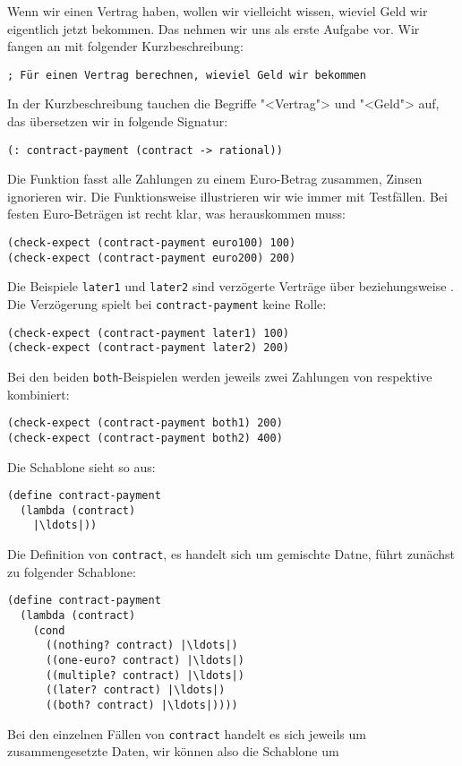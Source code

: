 Wenn wir einen Vertrag haben, wollen wir vielleicht wissen, wieviel
Geld wir eigentlich jetzt bekommen.  Das nehmen wir uns als erste
Aufgabe vor.  Wir fangen an mit folgender Kurzbeschreibung:
%
\begin{lstlisting}
; Für einen Vertrag berechnen, wieviel Geld wir bekommen
\end{lstlisting}
%
In der Kurzbeschreibung tauchen die Begriffe "<Vertrag"> und "<Geld">
auf, das übersetzen wir in folgende Signatur:
%
\begin{lstlisting}
(: contract-payment (contract -> rational))
\end{lstlisting}
%
Die Funktion fasst alle Zahlungen zu einem Euro-Betrag zusammen,
Zinsen ignorieren wir.  Die Funktionsweise illustrieren wir wie immer
mit Testfällen.  Bei festen Euro-Beträgen ist recht klar, was
herauskommen muss:
%
\begin{lstlisting}
(check-expect (contract-payment euro100) 100)
(check-expect (contract-payment euro200) 200)
\end{lstlisting}
%
Die Beispiele \lstinline{later1} und \lstinline{later2} sind
verzögerte Verträge über  beziehungsweise .  Die
Verzögerung spielt bei \lstinline{contract-payment} keine Rolle:
%
\begin{lstlisting}
(check-expect (contract-payment later1) 100)
(check-expect (contract-payment later2) 200)
\end{lstlisting}
%
Bei den beiden \lstinline{both}-Beispielen werden jeweils zwei
Zahlungen von  respektive  kombiniert:
%
\begin{lstlisting}
(check-expect (contract-payment both1) 200)
(check-expect (contract-payment both2) 400)
\end{lstlisting}
%
Die Schablone sieht so aus:
%
\begin{lstlisting}
(define contract-payment
  (lambda (contract)
    |\ldots|))
\end{lstlisting}
%
Die Definition von \lstinline{contract}, es handelt sich um gemischte
Datne, führt zunächst zu folgender Schablone:
%
\begin{lstlisting}
(define contract-payment
  (lambda (contract)
    (cond
      ((nothing? contract) |\ldots|)
      ((one-euro? contract) |\ldots|)
      ((multiple? contract) |\ldots|)
      ((later? contract) |\ldots|)
      ((both? contract) |\ldots|))))
\end{lstlisting}
%
Bei den einzelnen Fällen von \lstinline{contract} handelt es sich
jeweils um zusammengesetzte Daten, wir können also die Schablone um
